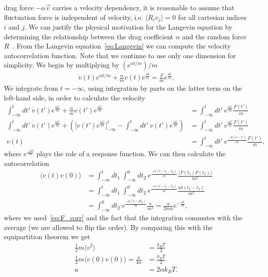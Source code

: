 drag force $-\alpha \vec{v}$ carries a velocity dependency, it is reasonable to assume that fluctuation force is independent of velocity, i.e. $\langle R_i v_j \rangle = 0$ for all cartesian indices $i$ and $j$. We can justify the physical motivation for the Langevin equation by determining the relationship between the drag coefficient $\alpha$ and the random force $R$~\cite{stat_phys}. From the Langevin equation~\cref{eq:Langevin} we can compute the velocity autocorrelation function. Note that we continue to use only one dimension for simplicity. We begin by multiplying by $(e^{\alpha t /m})/m$
\begin{align*}
  \dot{ v}(t)e^{\alpha t /m} + \frac{\alpha}{m} v(t)e^{\frac{\alpha t}{m}}  = \frac{ F}{m}e^{\frac{\alpha t}{m}}.
\end{align*}
We integrate from $t = -\infty$, using integration by parts on the
latter term on the left-hand side, in order to calculate the velocity 
\begin{align*}
  \int_{-\infty}^t dt' \ \dot{ v}(t')e^{\frac{\alpha t'}{m}} + \frac{\alpha}{m} v(t')e^{\frac{\alpha t'}{m}} &=  \int_{-\infty}^t dt' \ e^{\frac{\alpha t'}{m}} \frac{ F(t')}{m}  \\
  \int_{-\infty}^t dt' \ \dot{ v}(t')e^{\frac{\alpha t'}{m}} + \left(\Big[ v(t')e^{\frac{\alpha t'}{m}}\Big]_{-\infty}^t - \int_{-\infty}^t dt' \ \dot{ v}(t')e^{\frac{\alpha t'}{m}}\right) &= \int_{-\infty}^t dt' \ e^{\frac{\alpha t'}{m}} \frac{ F(t')}{m}  \\
   v(t) &= \int_{-\infty}^t dt' \ e^{\frac{-\alpha(t - t')}{m}} \frac{ F(t')}{m},
\end{align*}
where $e^{\frac{-\alpha t}{m}}$ plays the role of a response function. We can
then calculate the autocorrelation 
\begin{align*}
  \big\langle  v(t) v(0) \big\rangle &= \int_{-\infty}^t dt_1 \ \int_{-\infty}^0 dt_2 \ e^{\frac{-\alpha(t - t_1 - t_2)}{m}} \frac{\langle  F(t_1)  F(t_2) \rangle}{m^2} \\
  &= \int_{-\infty}^t dt_1 \ \int_{-\infty}^0 dt_2 \ e^{\frac{-\alpha(t - t_1 - t_2)}{m}} \frac{a \delta(t_1 - t_2)}{m^2} \\
  &= \int_{-\infty}^0 dt_2 \ e^{\frac{-\alpha(t - 2t_2)}{m}} \frac{a}{m^2} = \frac{a}{2m\alpha}e^{-\frac{\alpha t}{m}},
\end{align*}
where we used~\cref{eq:F_corr} and the fact that the integration commutes with
the average (we are allowed to flip the order). By comparing this with the
equipartition theorem we get 
\begin{align*}
  \frac{1}{2}m\langle  v^2 \rangle &= \frac{k_BT}{2} \\
  \frac{1}{2}m\langle  v(0) v(0) \rangle = \frac{a}{4\alpha} &= \frac{k_BT}{2} \\
  a &=  2\alpha k_B T.
\end{align*}
